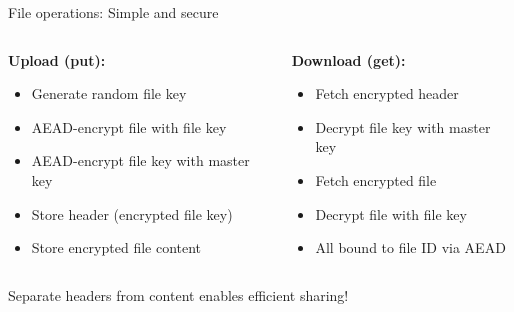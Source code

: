 \documentclass[aspectratio=169, lualatex, handout]{beamer}
\begin{document}
\begin{frame}{File operations: Simple and secure}
	\begin{columns}[c]
		\begin{column}{0.5\textwidth}
			\textbf{Upload (put):}
			\begin{itemize}
				\item Generate random file key
				\item AEAD-encrypt file with file key
				\item AEAD-encrypt file key with master key
				\item Store header (encrypted file key)
				\item Store encrypted file content
			\end{itemize}
		\end{column}
		\begin{column}{0.5\textwidth}
			\textbf{Download (get):}
			\begin{itemize}
				\item Fetch encrypted header
				\item Decrypt file key with master key
				\item Fetch encrypted file
				\item Decrypt file with file key
				\item All bound to file ID via AEAD
			\end{itemize}
		\end{column}
	\end{columns}
	\vspace{0.5cm}
	\begin{center}
		Separate headers from content enables efficient sharing!
	\end{center}
\end{frame}
\end{document}
